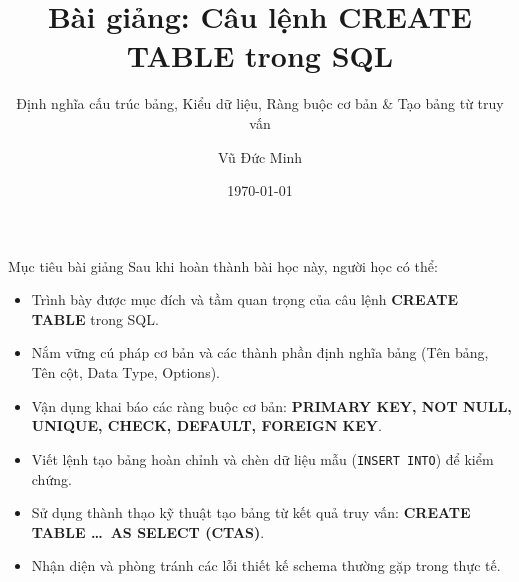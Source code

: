 \documentclass[aspectratio=169,11pt]{beamer}
\title[SQL CREATE TABLE]{Bài giảng: Câu lệnh CREATE TABLE trong SQL}
\subtitle{Định nghĩa cấu trúc bảng, Kiểu dữ liệu, Ràng buộc cơ bản \& Tạo bảng từ truy vấn}
\author[Vũ Đức Minh]{Vũ Đức Minh}
\institute[NEU]{Trường Đại học Kinh tế Quốc dân (NEU), Hà Nội, Việt Nam}
\date{\today}
\newcommand{\kw}[1]{\textcolor{dbblue}{\textbf{#1}}}
\begin{document}
\begin{frame}
  \titlepage
\end{frame}

\begin{frame}{Mục tiêu bài giảng}
Sau khi hoàn thành bài học này, người học có thể:
\begin{itemize}\setlength{\itemsep}{1.5pt}
  \item Trình bày được mục đích và tầm quan trọng của câu lệnh \kw{CREATE TABLE} trong SQL.
  \item Nắm vững cú pháp cơ bản và các thành phần định nghĩa bảng (Tên bảng, Tên cột, Data Type, Options).
  \item Vận dụng khai báo các ràng buộc cơ bản: \kw{PRIMARY KEY, NOT NULL, UNIQUE, CHECK, DEFAULT, FOREIGN KEY}.
  \item Viết lệnh tạo bảng hoàn chỉnh và chèn dữ liệu mẫu (\texttt{INSERT INTO}) để kiểm chứng.
  \item Sử dụng thành thạo kỹ thuật tạo bảng từ kết quả truy vấn: \kw{CREATE TABLE \dots\ AS SELECT (CTAS)}.
  \item Nhận diện và phòng tránh các lỗi thiết kế schema thường gặp trong thực tế.
\end{itemize}
\end{frame}
\end{document}
